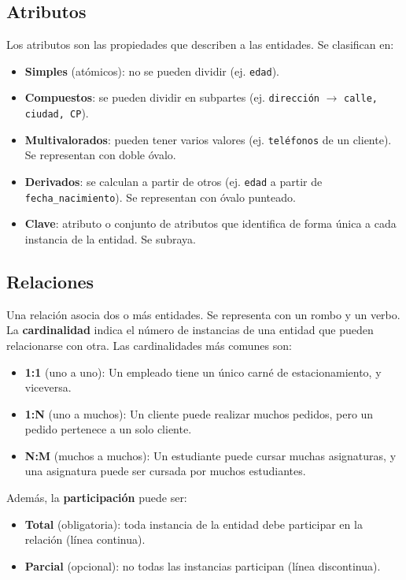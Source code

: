 \documentclass[12pt,a4paper,openany,oneside]{book}
\begin{document}
\subsection{Atributos}
Los atributos son las propiedades que describen a las entidades. Se clasifican en:
\begin{itemize}
    \item \textbf{Simples} (atómicos): no se pueden dividir (ej. \texttt{edad}).
    \item \textbf{Compuestos}: se pueden dividir en subpartes (ej. \texttt{dirección} $\rightarrow$ \texttt{calle, ciudad, CP}).
    \item \textbf{Multivalorados}: pueden tener varios valores (ej. \texttt{teléfonos} de un cliente). Se representan con doble óvalo.
    \item \textbf{Derivados}: se calculan a partir de otros (ej. \texttt{edad} a partir de \texttt{fecha\_nacimiento}). Se representan con óvalo punteado.
    \item \textbf{Clave}: atributo o conjunto de atributos que identifica de forma única a cada instancia de la entidad. Se subraya.
\end{itemize}

\subsection{Relaciones}
Una relación asocia dos o más entidades. Se representa con un rombo y un verbo. La \textbf{cardinalidad} indica el número de instancias de una entidad que pueden relacionarse con otra. Las cardinalidades más comunes son:
\begin{itemize}
    \item \textbf{1:1} (uno a uno): Un empleado tiene un único carné de estacionamiento, y viceversa.
    \item \textbf{1:N} (uno a muchos): Un cliente puede realizar muchos pedidos, pero un pedido pertenece a un solo cliente.
    \item \textbf{N:M} (muchos a muchos): Un estudiante puede cursar muchas asignaturas, y una asignatura puede ser cursada por muchos estudiantes.
\end{itemize}
Además, la \textbf{participación} puede ser:
\begin{itemize}
    \item \textbf{Total} (obligatoria): toda instancia de la entidad debe participar en la relación (línea continua).
    \item \textbf{Parcial} (opcional): no todas las instancias participan (línea discontinua).
\end{itemize}
\end{document}
